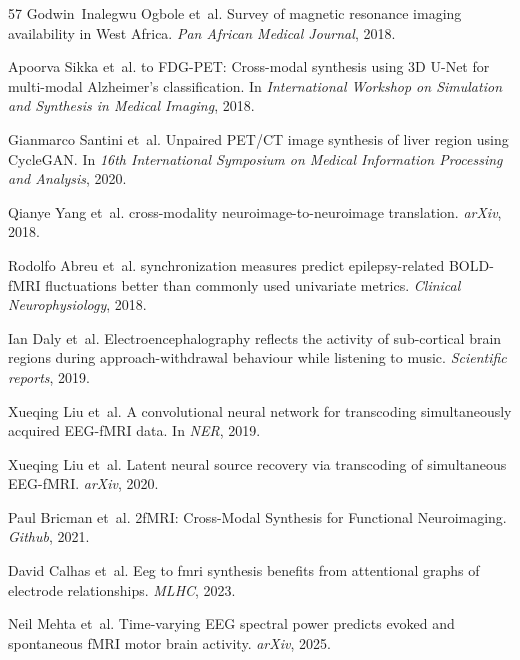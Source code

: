 \documentclass{article}
\begin{document}
\begin{thebibliography}{57}
Godwin~Inalegwu Ogbole et~al.
\newblock Survey of magnetic resonance imaging availability in {W}est {A}frica.
\newblock \emph{Pan African Medical Journal}, 2018.

Apoorva Sikka et~al.
 to {FDG}-{PET}: {C}ross-modal synthesis using 3{D} {U}-{N}et for multi-modal {A}lzheimer’s classification.
\newblock In \emph{International Workshop on Simulation and Synthesis in Medical Imaging}, 2018.

Gianmarco Santini et~al.
\newblock Unpaired {PET}/{CT} image synthesis of liver region using {C}ycle{GAN}.
\newblock In \emph{16th International Symposium on Medical Information Processing and Analysis}, 2020.

Qianye Yang et~al.
 cross-modality neuroimage-to-neuroimage translation.
\newblock \emph{arXiv}, 2018.

Rodolfo Abreu et~al.
 synchronization measures predict epilepsy-related {BOLD}-f{MRI} fluctuations better than commonly used univariate metrics.
\newblock \emph{Clinical {N}europhysiology}, 2018.

Ian Daly et~al.
\newblock Electroencephalography reflects the activity of sub-cortical brain regions during approach-withdrawal behaviour while listening to music.
\newblock \emph{Scientific reports}, 2019.

Xueqing Liu et~al.
\newblock A convolutional neural network for transcoding simultaneously acquired {EEG}-f{MRI} data.
\newblock In \emph{NER}, 2019.

Xueqing Liu et~al.
\newblock Latent neural source recovery via transcoding of simultaneous {EEG}-f{MRI}.
\newblock \emph{arXiv}, 2020.

Paul Bricman et~al.
2f{MRI}: {C}ross-{M}odal {S}ynthesis for {F}unctional {N}euroimaging.
\newblock \emph{Github}, 2021.

David Calhas et~al.
\newblock Eeg to fmri synthesis benefits from attentional graphs of electrode relationships.
\newblock \emph{MLHC}, 2023.

Neil Mehta et~al.
\newblock Time-varying {EEG} spectral power predicts evoked and spontaneous f{MRI} motor brain activity.
\newblock \emph{arXiv}, 2025.


\end{thebibliography}
\end{document}
